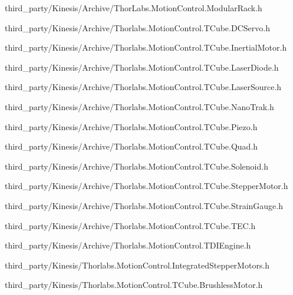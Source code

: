 \begin{DoxyCompactItemize}
third\+\_\+party/\+Kinesis/\+Archive/Thor\+Labs.\+Motion\+Control.\+Modular\+Rack.\+h\item 
third\+\_\+party/\+Kinesis/\+Archive/Thorlabs.\+Motion\+Control.\+T\+Cube.\+D\+C\+Servo.\+h\item 
third\+\_\+party/\+Kinesis/\+Archive/Thorlabs.\+Motion\+Control.\+T\+Cube.\+Inertial\+Motor.\+h\item 
third\+\_\+party/\+Kinesis/\+Archive/Thorlabs.\+Motion\+Control.\+T\+Cube.\+Laser\+Diode.\+h\item 
third\+\_\+party/\+Kinesis/\+Archive/Thorlabs.\+Motion\+Control.\+T\+Cube.\+Laser\+Source.\+h\item 
third\+\_\+party/\+Kinesis/\+Archive/Thorlabs.\+Motion\+Control.\+T\+Cube.\+Nano\+Trak.\+h\item 
third\+\_\+party/\+Kinesis/\+Archive/Thorlabs.\+Motion\+Control.\+T\+Cube.\+Piezo.\+h\item 
third\+\_\+party/\+Kinesis/\+Archive/Thorlabs.\+Motion\+Control.\+T\+Cube.\+Quad.\+h\item 
third\+\_\+party/\+Kinesis/\+Archive/Thorlabs.\+Motion\+Control.\+T\+Cube.\+Solenoid.\+h\item 
third\+\_\+party/\+Kinesis/\+Archive/Thorlabs.\+Motion\+Control.\+T\+Cube.\+Stepper\+Motor.\+h\item 
third\+\_\+party/\+Kinesis/\+Archive/Thorlabs.\+Motion\+Control.\+T\+Cube.\+Strain\+Gauge.\+h\item 
third\+\_\+party/\+Kinesis/\+Archive/Thorlabs.\+Motion\+Control.\+T\+Cube.\+T\+E\+C.\+h\item 
third\+\_\+party/\+Kinesis/\+Archive/Thorlabs.\+Motion\+Control.\+T\+D\+I\+Engine.\+h\item 
third\+\_\+party/\+Kinesis/Thorlabs.\+Motion\+Control.\+Integrated\+Stepper\+Motors.\+h\item 
third\+\_\+party/\+Kinesis/Thorlabs.\+Motion\+Control.\+T\+Cube.\+Brushless\+Motor.\+h\end{DoxyCompactItemize}
